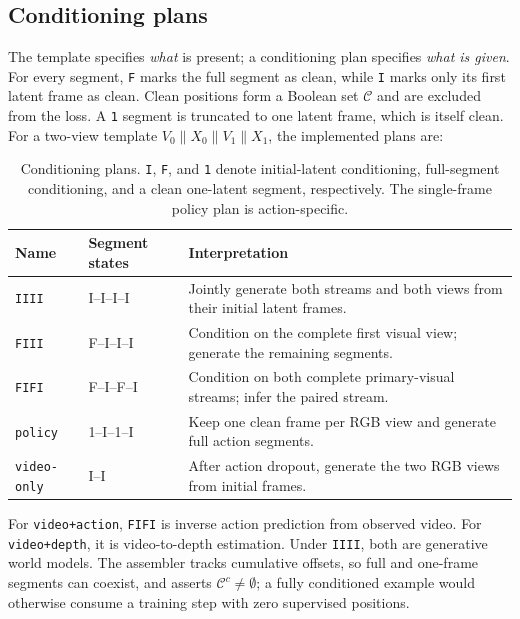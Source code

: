 \documentclass{article}
\newcommand{\code}[1]{\texttt{#1}}
\newcommand{\given}{\mathcal{C}}
\newcommand{\concat}{\mathbin{\|}}
\begin{document}
\subsection{Conditioning plans}
\label{sec:masks}

The template specifies \emph{what} is present; a conditioning plan specifies \emph{what is
given}. For every segment, \code{F} marks the full segment as clean, while \code{I} marks only
its first latent frame as clean. Clean positions form a Boolean set $\given$ and are excluded
from the loss. A \code{1} segment is truncated to one latent frame, which is itself clean. For a
two-view template $V_0\concat X_0\concat V_1\concat X_1$, the implemented plans are:

\begin{table}[t]
\caption{Conditioning plans. \code{I}, \code{F}, and \code{1} denote initial-latent
conditioning, full-segment conditioning, and a clean one-latent segment, respectively. The
single-frame policy plan is action-specific.}
\label{tab:masks}
\centering
\small
\begin{tabular}{llp{7.3cm}}
\toprule
\textbf{Name} & \textbf{Segment states} & \textbf{Interpretation} \\
\midrule
\code{IIII} & I--I--I--I & Jointly generate both streams and both views from their initial latent frames. \\
\code{FIII} & F--I--I--I & Condition on the complete first visual view; generate the remaining segments. \\
\code{FIFI} & F--I--F--I & Condition on both complete primary-visual streams; infer the paired stream. \\
\code{policy} & 1--I--1--I & Keep one clean frame per RGB view and generate full action segments. \\
\code{video-only} & I--I & After action dropout, generate the two RGB views from initial frames. \\
\bottomrule
\end{tabular}
\end{table}

For \code{video+action}, \code{FIFI} is inverse action prediction from observed video. For
\code{video+depth}, it is video-to-depth estimation. Under \code{IIII}, both are generative world
models. The assembler tracks cumulative offsets, so full and one-frame segments can coexist, and
asserts $\given^c\neq\emptyset$; a fully conditioned example would otherwise consume a training
step with zero supervised positions.
\end{document}
